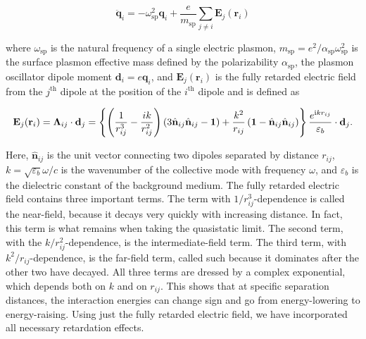 \documentclass[journal=apchd5,manuscript=article]{achemso}
\begin{document}
\begin{equation}
\ddot{\textbf{q}}_i = -\omega_{\textrm{sp}}^2\textbf{q}_i + \frac{e}{m_{\textrm{sp}}}\sum_{j\neq i}\textbf{E}_j(\textbf{r}_i)
\label{equation_of_motion}
\end{equation}

\noindent where $\omega_{\textrm{sp}}$ is the natural frequency of a single electric plasmon, $m_{\textrm{sp}} = e^2/\alpha_{\textrm{sp}}\omega_{\textrm{sp}}^2$ is the surface plasmon effective mass defined by the polarizability $\alpha_{\textrm{sp}}$, the plasmon oscillator dipole moment $\textbf{d}_i = e\textbf{q}_i$, and $\textbf{E}_j(\textbf{r}_i)$ is the fully retarded electric field from the $j^{\textrm{th}}$ dipole at the position of the $i^{\textrm{th}}$ dipole and is defined as 

\begin{equation}
\textbf{E}_j(\textbf{r}_i) = \boldsymbol{\Lambda}_{ij}\cdot\textbf{d}_j\\
= \left\{\left(\frac{1}{r_{ij}^3} - \frac{ik}{r_{ij}^2}\right)\left(3\hat{\textbf{n}}_{ij}\hat{\textbf{n}}_{ij} - \textbf{1}\right) + \frac{k^2}{r_{ij}}\left(\textbf{1}-\hat{\textbf{n}}_{ij}\hat{\textbf{n}}_{ij}\right)\right\}\frac{e^{\textrm{i}kr_{ij}}}{\varepsilon_b}\cdot\textbf{d}_j.
\label{electric_field_lambda}
\end{equation}

\noindent Here, $\hat{\textbf{n}}_{ij}$ is the unit vector connecting two dipoles separated by distance $r_{ij}$, $k=\sqrt{\varepsilon_b}\omega/c$ is the wavenumber of the collective mode with frequency $\omega$, and $\varepsilon_b$ is the dielectric constant of the background medium. The fully retarded electric field contains three important terms. The term with $1/r_{ij}^3$-dependence is called the near-field, because it decays very quickly with increasing distance. In fact, this term is what remains when taking the quasistatic limit. The second term, with the $k/r_{ij}^2$-dependence, is the intermediate-field term. The third term, with $k^2/r_{ij}$-dependence, is the far-field term, called such because it dominates after the other two have decayed. All three terms are dressed by a complex exponential, which depends both on $k$ and on $r_{ij}$. This shows that at specific separation distances, the interaction energies can change sign and go from energy-lowering to energy-raising. Using just the fully retarded electric field, we have incorporated all necessary retardation effects\cite{Purcell1973}.
\end{document}
